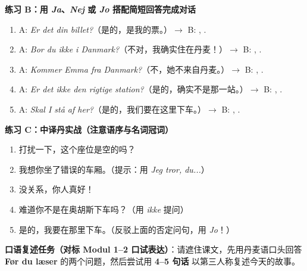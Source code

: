 \textbf{练习 B：用 \textit{Ja}、\textit{Nej} 或 \textit{Jo} 搭配简短回答完成对话}
\begin{enumerate}
  \item A: \textit{Er det din billet?}（是的，是我的票。）$\rightarrow$ B: \underline{\hspace{1.2cm}}, \underline{\hspace{3.2cm}}.
  \item A: \textit{Bor du ikke i Danmark?}（不对，我确实住在丹麦！）$\rightarrow$ B: \underline{\hspace{1.2cm}}, \underline{\hspace{3.2cm}}.
  \item A: \textit{Kommer Emma fra Danmark?}（不，她不来自丹麦。）$\rightarrow$ B: \underline{\hspace{1.2cm}}, \underline{\hspace{3.2cm}}.
  \item A: \textit{Er det ikke den rigtige station?}（是的，确实不是那一站。）$\rightarrow$ B: \underline{\hspace{1.2cm}}, \underline{\hspace{3.2cm}}.
  \item A: \textit{Skal I stå af her?}（是的，我们要在这里下车。）$\rightarrow$ B: \underline{\hspace{1.2cm}}, \underline{\hspace{3.2cm}}.
\end{enumerate}

\textbf{练习 C：中译丹实战（注意语序与名词冠词）}
\begin{enumerate}
  \item 打扰一下，这个座位是空的吗？
  \item 我想你坐了错误的车厢。（提示：用 \textit{Jeg tror, du...}）
  \item 没关系，你人真好！
  \item 难道你不是在奥胡斯下车吗？（用 \textit{ikke} 提问）
  \item 是的，我要在那里下车。（反驳上面的否定问句，用 \textit{Jo}！）
\end{enumerate}


\textbf{口语复述任务（对标 Modul 1--2 口试表达）}：请遮住课文，先用丹麦语口头回答 \textbf{Før du læser} 的两个问题，然后尝试用 \textbf{4--5 句话} 以第三人称复述今天的故事。

